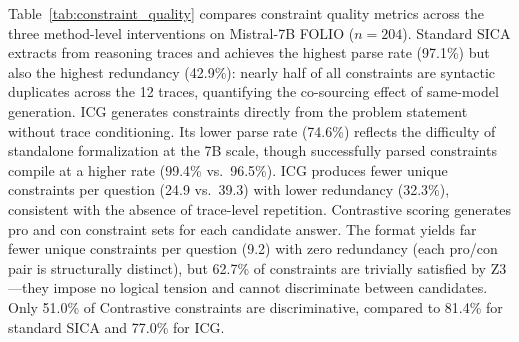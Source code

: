 Table~\ref{tab:constraint_quality} compares constraint quality metrics across the three method-level interventions on Mistral-7B FOLIO ($n = 204$). Standard SICA extracts from reasoning traces and achieves the highest parse rate (97.1\%) but also the highest redundancy (42.9\%): nearly half of all constraints are syntactic duplicates across the 12 traces, quantifying the co-sourcing effect of same-model generation. ICG generates constraints directly from the problem statement without trace conditioning. Its lower parse rate (74.6\%) reflects the difficulty of standalone formalization at the 7B scale, though successfully parsed constraints compile at a higher rate (99.4\% vs.\ 96.5\%). ICG produces fewer unique constraints per question (24.9 vs.\ 39.3) with lower redundancy (32.3\%), consistent with the absence of trace-level repetition. Contrastive scoring generates pro and con constraint sets for each candidate answer. The format yields far fewer unique constraints per question (9.2) with zero redundancy (each pro/con pair is structurally distinct), but 62.7\% of constraints are trivially satisfied by Z3---they impose no logical tension and cannot discriminate between candidates. Only 51.0\% of Contrastive constraints are discriminative, compared to 81.4\% for standard SICA and 77.0\% for ICG.

\begin{table}[h]
\centering
\small
\caption{Constraint quality metrics across method-level interventions (Mistral-7B, FOLIO, $n = 204$). Parse: fraction of extraction attempts yielding valid JSON. Z3 Compile: fraction compiling to Z3 formulas. Unique/q: mean unique constraints per question. Redundancy: fraction of constraints duplicated across traces. Disc.: fraction discriminative (different Z3 outcome per candidate). Triv.\ Sat.: fraction trivially satisfied (no logical tension).}
\label{tab:constraint_quality}
\end{table}

